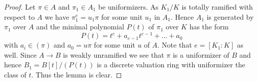 \documentclass[10pt,a4paper]{amsart}
\theoremstyle{plain}
\theoremstyle{definition}
\theoremstyle{remark}
\numberwithin{equation}{subsection}
\begin{document}
\begin{proof}
Let $\pi \in A$ and $\pi_1 \in A_1$ be uniformizers. As $K_1/K$
is totally ramified with respect to $A$
we have $\pi_1^e = u_1 \pi$ for some unit $u_1$ in $A_1$.
Hence $A_1$ is generated by $\pi_1$ over $A$ and the minimal polynomial
$P(t)$ of $\pi_1$ over $K$ has the form
$$
P(t) = t^e + a_{e - 1} t^{e - 1} + \ldots + a_0
$$
with $a_i \in (\pi)$ and $a_0 = u\pi$ for some unit $u$ of $A$.
Note that $e = [K_1 : K]$ as well. Since $A \to B$ is weakly
unramified we see that $\pi$ is a uniformizer of $B$ and hence
$B_1 = B[t]/(P(t))$ is a discrete valuation ring with uniformizer
the class of $t$. Thus the lemma is clear.
\end{proof}
\end{document}
